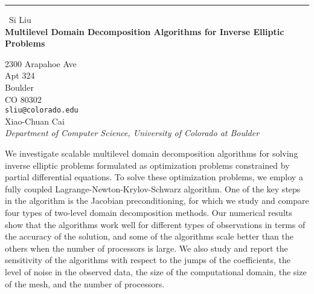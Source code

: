 \documentclass{report}
\begin{document}
\begin{center}
\rule{6in}{1pt} \
{\large Si Liu \\
{\bf Multilevel Domain Decomposition Algorithms for Inverse Elliptic Problems }}

2300 Arapahoe Ave \\ Apt 324 \\ Boulder \\ CO 80302
\\
{\tt sliu@colorado.edu}\\
Xiao-Chuan Cai\\
{\em Department of Computer Science, University of Colorado at Boulder}\end{center}

We investigate scalable multilevel domain decomposition algorithms for
solving inverse elliptic problems formulated as optimization problems
constrained by partial differential equations. To solve these
optimization problems, we employ a fully coupled
Lagrange-Newton-Krylov-Schwarz algorithm. One of the key steps in the
algorithm is the Jacobian preconditioning, for which we study and compare
four types of two-level
domain decomposition methods. Our numerical results show that the
algorithms work well for different types of observations in terms of the
accuracy of the solution, and some of the algorithms scale better than
the others when the number of processors is large. We also study and
report the sensitivity
of the algorithms with respect to the jumps of the coefficients, the
level of noise in the observed data, the size of the computational
domain, the size of the mesh, and the number of processors.
\end{document}
